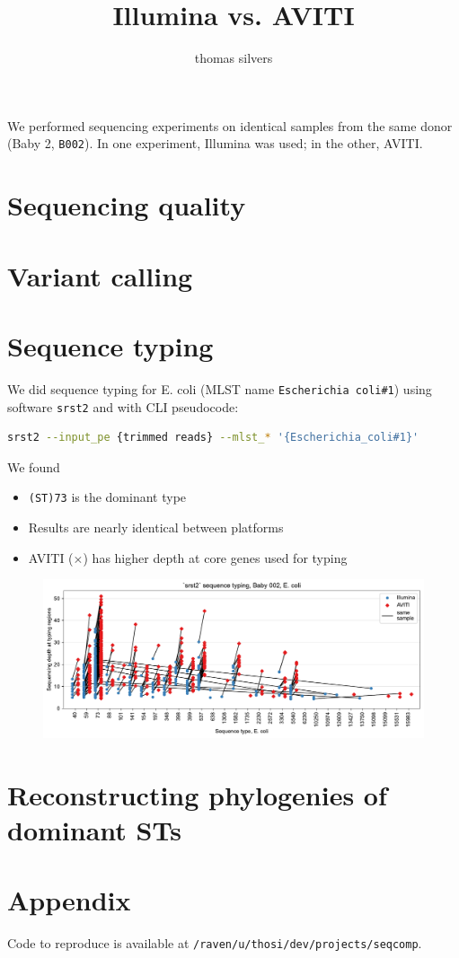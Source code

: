 \documentclass{article}
\title{Illumina vs. AVITI}
\author{thomas silvers}
\begin{document}
\maketitle

\noindent
We performed sequencing experiments on identical samples from the same donor (Baby 2, \texttt{B002}). In one experiment, Illumina was used; in the other, AVITI.

\section{Sequencing quality}

\section{Variant calling}

\section{Sequence typing}

We did sequence typing for E. coli (MLST name \texttt{Escherichia coli\#1}) using software \texttt{srst2} and with CLI pseudocode:

\begin{lstlisting}[language=bash]
srst2 --input_pe {trimmed reads} --mlst_* '{Escherichia_coli#1}'
\end{lstlisting}

\noindent
We found

\begin{itemize}
    \item \texttt{(ST)73} is the dominant type
    \item Results are nearly identical between platforms
    \item AVITI ($\times$) has higher depth at core genes used for typing
\end{itemize}

\begin{figure}[!h]
    \centering
    \includegraphics[width=.9\textwidth]{figures/sequence_typing.pdf}
    \label{fig:st}
\end{figure}

\section{Reconstructing phylogenies of dominant STs}

\section{Appendix}

Code to reproduce is available at \texttt{/raven/u/thosi/dev/projects/seqcomp}.
\end{document}
